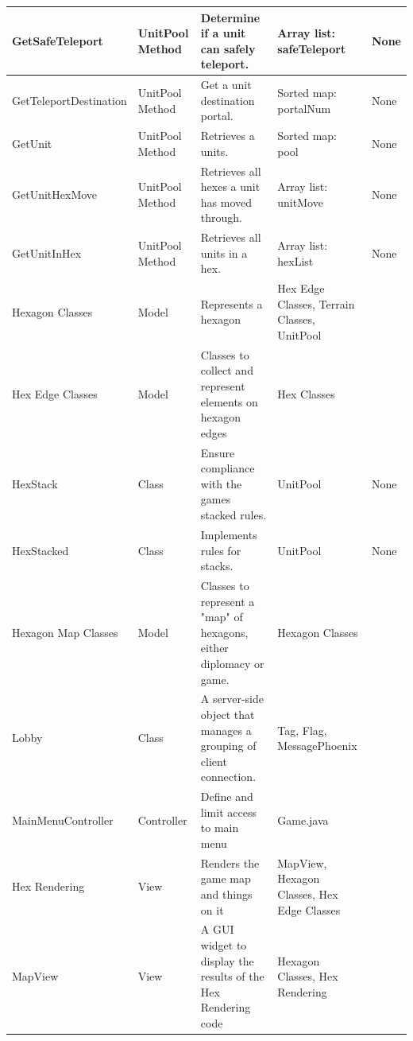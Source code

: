 \documentclass[12pt,a4paper,titlepage]{article}
\begin{document}
{\begin{center}
\begin{tabularx}{\linewidth}{|p{1.5in}|X|X|X|X|}
\hline
GetSafeTeleport & UnitPool Method & Determine if a unit can safely teleport. & Array list: safeTeleport & None\\
\hline
GetTeleportDestination & UnitPool Method & Get a unit destination portal. & Sorted map: portalNum & None\\
\hline
GetUnit & UnitPool Method & Retrieves a  units. & Sorted map: pool & None\\
\hline
GetUnitHexMove & UnitPool Method & Retrieves all hexes a unit has moved through. & Array list: unitMove & None\\
\hline
GetUnitInHex & UnitPool Method & Retrieves all units in a hex. & Array list: hexList & None\\
\hline

Hexagon Classes & Model & Represents a hexagon & Hex Edge Classes, Terrain Classes, UnitPool & \\
\hline
Hex Edge Classes & Model & Classes to collect and represent elements on hexagon edges & Hex Classes & \\
\hline
HexStack & Class & Ensure compliance with the games stacked rules. & UnitPool & None\\
\hline
HexStacked & Class & Implements rules for stacks. & UnitPool & None\\
\hline
Hexagon Map Classes & Model & Classes to represent a "map" of hexagons, either diplomacy or game. & Hexagon Classes & \\
\hline
Lobby & Class & A server-side object that manages a grouping of client connection. & Tag, Flag, MessagePhoenix & \\ 
\hline
MainMenuController & Controller & Define and limit access to main menu & Game.java & \\
\hline
Hex Rendering & View & Renders the game map and things on it & MapView, Hexagon Classes, Hex Edge Classes & \\
\hline
MapView & View & A GUI widget to display the results of the Hex Rendering code & Hexagon Classes, Hex Rendering& \\


\end{tabularx}
\end{center}}
\end{document}
